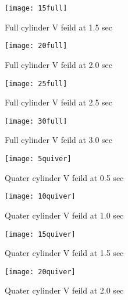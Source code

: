 \documentclass[12pt]{article}
\begin{document}
\begin{figure}
\centering
\begin{minipage}{.5\textwidth}
  \centering
  \texttt{[image: 15full]}
  \captionsetup{width=0.8\textwidth}
  \caption{Full cylinder V feild at 1.5 sec} 
\end{minipage}%
\begin{minipage}{.5\textwidth}
  \centering
  \texttt{[image: 20full]}
  \captionsetup{width=0.8\textwidth}
  \caption{Full cylinder V feild at 2.0 sec} 
\end{minipage}
\end{figure}

\begin{figure}
\centering
\begin{minipage}{.5\textwidth}
  \centering
  \texttt{[image: 25full]}
  \captionsetup{width=0.8\textwidth}
  \caption{Full cylinder V feild at 2.5 sec} 
\end{minipage}%
\begin{minipage}{.5\textwidth}
  \centering
  \texttt{[image: 30full]}
  \captionsetup{width=0.8\textwidth}
  \caption{Full cylinder V feild at 3.0 sec} 
\end{minipage}
\end{figure}


\begin{figure}
\centering
\begin{minipage}{.5\textwidth}
  \centering
  \texttt{[image: 5quiver]}
  \captionsetup{width=0.8\textwidth}
  \caption{Quater cylinder V feild at 0.5 sec} 
\end{minipage}%
\begin{minipage}{.5\textwidth}
  \centering
  \texttt{[image: 10quiver]}
  \captionsetup{width=0.8\textwidth}
  \caption{Quater cylinder V feild at 1.0 sec} 
\end{minipage}
\end{figure}

\begin{figure}
\centering
\begin{minipage}{.5\textwidth}
  \centering
  \texttt{[image: 15quiver]}
  \captionsetup{width=0.8\textwidth}
  \caption{Quater cylinder V feild at 1.5 sec} 
\end{minipage}%
\begin{minipage}{.5\textwidth}
  \centering
  \texttt{[image: 20quiver]}
  \captionsetup{width=0.8\textwidth}
  \caption{Quater cylinder V feild at 2.0 sec} 
\end{minipage}
\end{figure}
\end{document}
